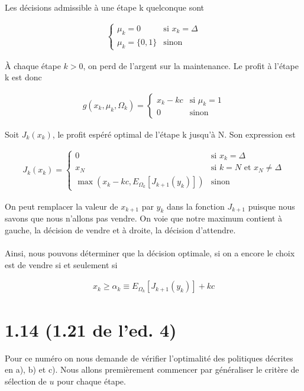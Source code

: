 \documentclass[oneside]{book}
\begin{document}
Les décisions admissible à une étape k quelconque sont 

\begin{gather*}
\begin{cases}
\mu_k = 0 &\text{si  } x_k = \Delta \\
\mu_k = \{0, 1\} &\text{sinon}
\end{cases}
\end{gather*}

À chaque étape $k > 0$, on perd de l'argent sur la maintenance. Le profit à l'étape k est donc 

\begin{gather*}
g(x_k, \mu_k, \Omega_k) =
\begin{cases}
x_k - kc &\text{si  } \mu_k = 1 \\
0 &\text{sinon}
\end{cases}
\end{gather*}

Soit $J_k(x_k)$, le profit espéré optimal de l'étape k jusqu'à N. Son expression est 

\begin{gather*}
J_k(x_k) = 
\begin{cases}
0 &\text{si  } x_k = \Delta \\
x_N &\text{si  } k = N \text{ et } x_N \neq \Delta \\
\max\left(x_k - kc, E_{\Omega_k}\left[J_{k+1}(y_{k})\right]\right) &\text{sinon}
\end{cases}
\end{gather*}

On peut remplacer la valeur de $x_{k+1}$ par $y_k$ dans la fonction $J_{k+1}$ puisque nous savons que nous n'allons pas vendre. On voie que notre maximum contient à gauche, la décision de vendre et à droite, la décision d'attendre.
\\\\
Ainsi, nous pouvons déterminer que la décision optimale, si on a encore le choix est de vendre si et seulement si 

\begin{gather*}
x_k \geq \alpha_k \equiv E_{\Omega_k}\left[J_{k+1}(y_{k})\right] + kc
\end{gather*}


\section*{1.14 (1.21 de l'ed. 4)}
Pour ce numéro on nous demande de vérifier l'optimalité des politiques décrites en a), b) et c). Nous allons premièrement commencer par généraliser le critère de sélection de $u$ pour chaque étape.\\
\end{document}
